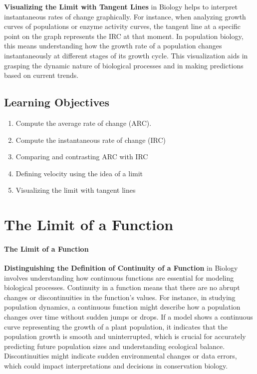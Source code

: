 \textbf{Visualizing the Limit with Tangent Lines} in Biology helps to interpret instantaneous rates of change graphically. For instance, when analyzing growth curves of populations or enzyme activity curves, the tangent line at a specific point on the graph represents the IRC at that moment. In population biology, this means understanding how the growth rate of a population changes instantaneously at different stages of its growth cycle. This visualization aids in grasping the dynamic nature of biological processes and in making predictions based on current trends.

\subsection{Learning Objectives}

\begin{enumerate}
    \item Compute the average rate of change (ARC).
    \item Compute the instantaneous rate of change (IRC)
    \item Comparing and contrasting ARC with IRC
    \item Defining velocity using the idea of a limit
    \item Visualizing the limit with tangent lines
\end{enumerate}

\section{The Limit of a Function}
\label{sec:the-limit-of-a-function}

\paragraph{The Limit of a Function}

\textbf{Distinguishing the Definition of Continuity of a Function} in Biology involves understanding how continuous functions are essential for modeling biological processes. Continuity in a function means that there are no abrupt changes or discontinuities in the function’s values. For instance, in studying population dynamics, a continuous function might describe how a population changes over time without sudden jumps or drops. If a model shows a continuous curve representing the growth of a plant population, it indicates that the population growth is smooth and uninterrupted, which is crucial for accurately predicting future population sizes and understanding ecological balance. Discontinuities might indicate sudden environmental changes or data errors, which could impact interpretations and decisions in conservation biology.

